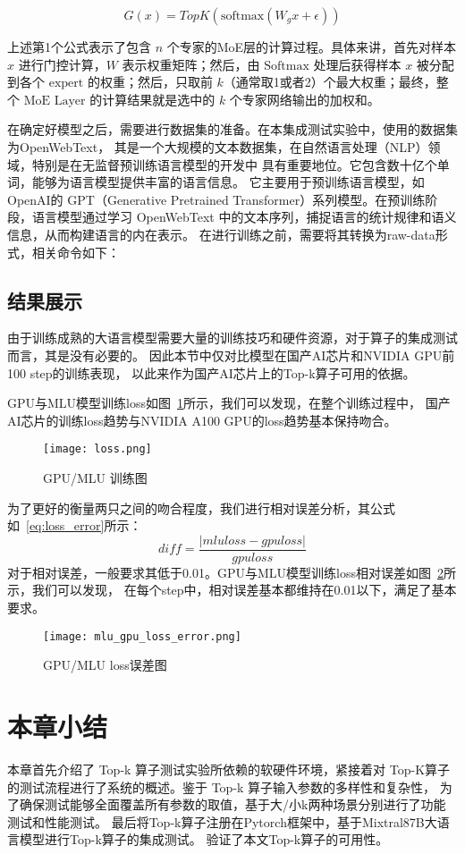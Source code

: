 \begin{equation}
G(x) = TopK(\text{softmax}(W_g x + \epsilon))
\end{equation}

上述第1个公式表示了包含 $n$ 个专家的MoE层的计算过程。具体来讲，首先对样本 $x$ 进行门控计算，$W$ 表示权重矩阵；然后，由 $\text{Softmax}$ 处理后获得样本 $x$ 被分配到各个 $\text{expert}$ 的权重；然后，只取前 $k$（通常取1或者2）个最大权重；最终，整个 $\text{MoE Layer}$ 的计算结果就是选中的 $k$ 个专家网络输出的加权和。

在确定好模型之后，需要进行数据集的准备。在本集成测试实验中，使用的数据集为OpenWebText，
其是一个大规模的文本数据集，在自然语言处理（NLP）领域，特别是在无监督预训练语言模型的开发中
具有重要地位。它包含数十亿个单词，能够为语言模型提供丰富的语言信息。
它主要用于预训练语言模型，如OpenAI的 GPT（Generative Pretrained Transformer）系列模型。在预训练阶段，语言模型通过学习 OpenWebText 中的文本序列，捕捉语言的统计规律和语义信息，从而构建语言的内在表示。
在进行训练之前，需要将其转换为raw-data形式，相关命令如下：


\subsection{结果展示}
由于训练成熟的大语言模型需要大量的训练技巧和硬件资源，对于算子的集成测试而言，其是没有必要的。
因此本节中仅对比模型在国产AI芯片和NVIDIA GPU前100 step的训练表现，
以此来作为国产AI芯片上的Top-k算子可用的依据。
    
GPU与MLU模型训练loss如图~\ref{fig:loss}所示，我们可以发现，在整个训练过程中，
国产AI芯片的训练loss趋势与NVIDIA A100 GPU的loss趋势基本保持吻合。 
\begin{figure}[ht]
    \centering
    \texttt{[image: loss.png]}
    \caption{GPU/MLU 训练图}
    \label{fig:loss}
\end{figure}
为了更好的衡量两只之间的吻合程度，我们进行相对误差分析，其公式如~\ref{eq:loss_error}所示：
\begin{equation}
    \label{eq:loss_error}
    diff = \frac{\vert mluloss - gpuloss \vert}{gpuloss}
\end{equation}
对于相对误差，一般要求其低于0.01。GPU与MLU模型训练loss相对误差如图~\ref{fig:mlu_gpu_loss_error}所示，我们可以发现，
在每个step中，相对误差基本都维持在0.01以下，满足了基本要求。
\begin{figure}[ht]
    \centering
    \texttt{[image: mlu\_gpu\_loss\_error.png]}
    \caption{GPU/MLU loss误差图}
    \label{fig:mlu_gpu_loss_error}
\end{figure}



\section{本章小结}
本章首先介绍了  Top-k 算子测试实验所依赖的软硬件环境，紧接着对 
 Top-K算子的测试流程进行了系统的概述。鉴于 Top-k 算子输入参数的多样性和复杂性， 
为了确保测试能够全面覆盖所有参数的取值，基于大/小k两种场景分别进行了功能测试和性能测试。
最后将Top-k算子注册在Pytorch框架中，基于Mixtral8\times7B大语言模型进行Top-k算子的集成测试。
验证了本文Top-k算子的可用性。